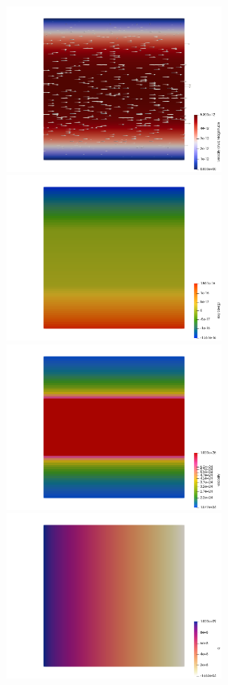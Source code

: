 \begin{center}
\includegraphics[width=7cm]{python_codes/fieldstone_61/results/n_1/vel.png}
\includegraphics[width=7cm]{python_codes/fieldstone_61/results/n_1/exy.png}\\
\includegraphics[width=7cm]{python_codes/fieldstone_61/results/n_1/eta.png}
\includegraphics[width=7cm]{python_codes/fieldstone_61/results/n_1/press.png}
\end{center}





